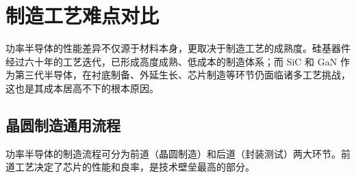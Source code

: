 \section{制造工艺难点对比}

功率半导体的性能差异不仅源于材料本身，更取决于制造工艺的成熟度。硅基器件经过六十年的工艺迭代，已形成高度成熟、低成本的制造体系；而 SiC 和 GaN 作为第三代半导体，在衬底制备、外延生长、芯片制造等环节仍面临诸多工艺挑战，这也是其成本居高不下的根本原因。

\subsection{晶圆制造通用流程}

功率半导体的制造流程可分为前道（晶圆制造）和后道（封装测试）两大环节。前道工艺决定了芯片的性能和良率，是技术壁垒最高的部分。

